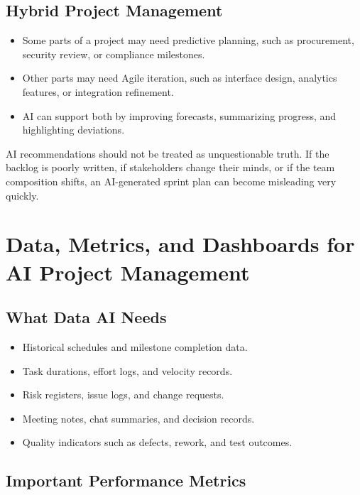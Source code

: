 \documentclass[11pt,a4paper]{article}
\begin{document}
\subsection{Hybrid Project Management}

\begin{itemize}[leftmargin=*]
  \item Some parts of a project may need predictive planning, such as procurement, security review, or compliance milestones.
  \item Other parts may need Agile iteration, such as interface design, analytics features, or integration refinement.
  \item AI can support both by improving forecasts, summarizing progress, and highlighting deviations.
\end{itemize}

\begin{alertbox}
AI recommendations should not be treated as unquestionable truth. If the backlog is poorly written, if stakeholders change their minds, or if the team composition shifts, an AI-generated sprint plan can become misleading very quickly.
\end{alertbox}

\section{Data, Metrics, and Dashboards for AI Project Management}

\subsection{What Data AI Needs}

\begin{itemize}[leftmargin=*]
  \item Historical schedules and milestone completion data.
  \item Task durations, effort logs, and velocity records.
  \item Risk registers, issue logs, and change requests.
  \item Meeting notes, chat summaries, and decision records.
  \item Quality indicators such as defects, rework, and test outcomes.
\end{itemize}

\subsection{Important Performance Metrics}
\end{document}
